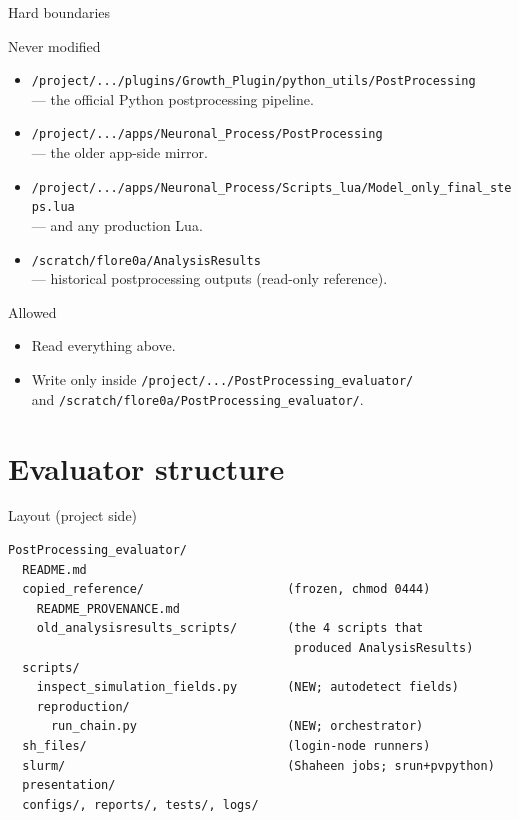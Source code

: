 \documentclass[aspectratio=169]{beamer}
\begin{document}
\begin{frame}{Hard boundaries}
\begin{block}{Never modified}
\begin{itemize}
  \item \texttt{/project/.../plugins/Growth\_Plugin/python\_utils/PostProcessing} \\
        --- the official Python postprocessing pipeline.
  \item \texttt{/project/.../apps/Neuronal\_Process/PostProcessing} \\
        --- the older app-side mirror.
  \item \texttt{/project/.../apps/Neuronal\_Process/Scripts\_lua/Model\_only\_final\_steps.lua} \\
        --- and any production Lua.
  \item \texttt{/scratch/flore0a/AnalysisResults} \\
        --- historical postprocessing outputs (read-only reference).
\end{itemize}
\end{block}

\begin{block}{Allowed}
\begin{itemize}
  \item Read everything above.
  \item Write only inside \texttt{/project/.../PostProcessing\_evaluator/} \\
        and \texttt{/scratch/flore0a/PostProcessing\_evaluator/}.
\end{itemize}
\end{block}
\end{frame}

\section{Evaluator structure}

\begin{frame}[fragile]{Layout (project side)}
\small
\begin{verbatim}
PostProcessing_evaluator/
  README.md
  copied_reference/                    (frozen, chmod 0444)
    README_PROVENANCE.md
    old_analysisresults_scripts/       (the 4 scripts that
                                        produced AnalysisResults)
  scripts/
    inspect_simulation_fields.py       (NEW; autodetect fields)
    reproduction/
      run_chain.py                     (NEW; orchestrator)
  sh_files/                            (login-node runners)
  slurm/                               (Shaheen jobs; srun+pvpython)
  presentation/
  configs/, reports/, tests/, logs/
\end{verbatim}
\end{frame}
\end{document}

